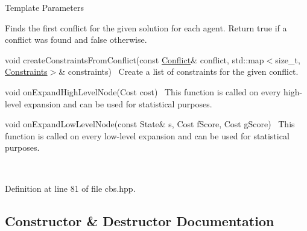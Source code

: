 \begin{DoxyTemplParams}{Template Parameters}
\begin{DoxyItemize}
 Finds the first conflict for the given solution for each agent. Return true if a conflict was found and false otherwise.
\item {\ttfamily void create\+Constraints\+From\+Conflict(const \hyperlink{structlib_multi_robot_planning_1_1_conflict}{Conflict}\& conflict, std\+::map$<$size\+\_\+t, \hyperlink{structlib_multi_robot_planning_1_1_constraints}{Constraints}$>$\& constraints)}~\newline
 Create a list of constraints for the given conflict.
\item {\ttfamily void on\+Expand\+High\+Level\+Node(\+Cost cost)}~\newline
 This function is called on every high-\/level expansion and can be used for statistical purposes.
\item {\ttfamily void on\+Expand\+Low\+Level\+Node(const State\& s, Cost f\+Score, Cost g\+Score)}~\newline
 This function is called on every low-\/level expansion and can be used for statistical purposes. 
\end{DoxyItemize}\\
\hline
\end{DoxyTemplParams}


Definition at line 81 of file cbs.\+hpp.



\subsection{Constructor \& Destructor Documentation}
\mbox{\label{classlib_multi_robot_planning_1_1_c_b_s_ad83ae3366ad3bfc2a7582ca53450ad97}} 
